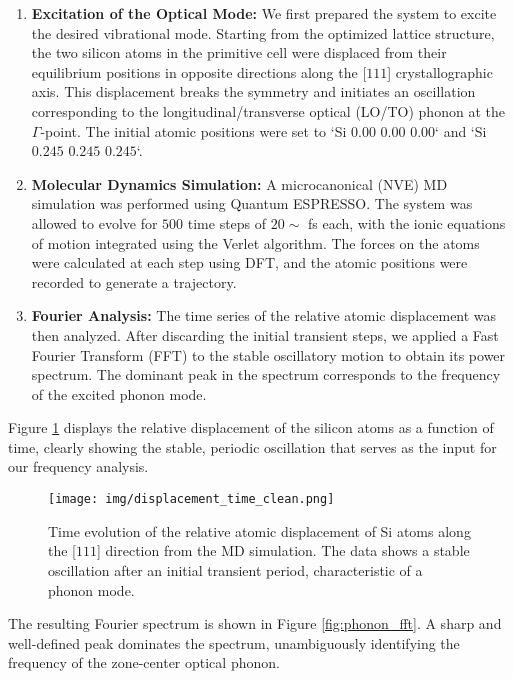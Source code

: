 \documentclass{article}
\begin{document}
\begin{enumerate}
    \item \textbf{Excitation of the Optical Mode:} We first prepared the system to excite the desired vibrational mode. Starting from the optimized lattice structure, the two silicon atoms in the primitive cell were displaced from their equilibrium positions in opposite directions along the [$111$] crystallographic axis. This displacement breaks the symmetry and initiates an oscillation corresponding to the longitudinal/transverse optical (LO/TO) phonon at the $\Gamma$-point. The initial atomic positions were set to `Si $0.00$ $0.00$ $0.00$` and `Si $0.245$ $0.245$ $0.245$`.

    \item \textbf{Molecular Dynamics Simulation:} A microcanonical (NVE) MD simulation was performed using Quantum ESPRESSO. The system was allowed to evolve for $500$ time steps of $20\sim$ fs each, with the ionic equations of motion integrated using the Verlet algorithm. The forces on the atoms were calculated at each step using DFT, and the atomic positions were recorded to generate a trajectory.

    \item \textbf{Fourier Analysis:} The time series of the relative atomic displacement was then analyzed. After discarding the initial transient steps, we applied a Fast Fourier Transform (FFT) to the stable oscillatory motion to obtain its power spectrum. The dominant peak in the spectrum corresponds to the frequency of the excited phonon mode.
\end{enumerate}

Figure \ref{fig:phonon_oscillation} displays the relative displacement of the silicon atoms as a function of time, clearly showing the stable, periodic oscillation that serves as the input for our frequency analysis.

\begin{figure}[h!]
    \centering
    \texttt{[image: img/displacement\_time\_clean.png]} %
    \caption{Time evolution of the relative atomic displacement of Si atoms along the [$111$] direction from the MD simulation. The data shows a stable oscillation after an initial transient period, characteristic of a phonon mode.}
    \label{fig:phonon_oscillation}
\end{figure}

The resulting Fourier spectrum is shown in Figure \ref{fig:phonon_fft}. A sharp and well-defined peak dominates the spectrum, unambiguously identifying the frequency of the zone-center optical phonon.
\end{document}
